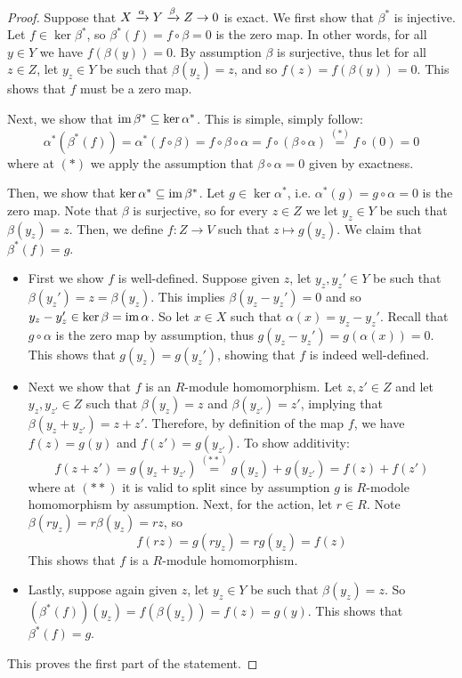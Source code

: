 \begin{proof}
    Suppose that $X\xrightarrow{\alpha} Y \xrightarrow{\beta} Z\to 0$ is exact. We first show that $\beta^*$ is injective. Let $f\in \ker \beta^*$, so $\beta^*(f) = f\circ \beta = 0$ is the zero map. In other words, for all $y\in Y$ we have $f(\beta(y))=0$. By assumption $\beta$ is surjective, thus let for all $z\in Z$, let $y_z\in Y$ be such that $\beta(y_z) = z$, and so $f(z) = f(\beta(y)) = 0$. This shows that $f$ must be a zero map.

    Next, we show that $\operatorname{im} \beta^* \subseteq \ker \alpha^*$. This is simple, simply follow:
    \[\alpha^*(\beta^*(f)) = \alpha^* (f\circ \beta) = f\circ \beta \circ \alpha = f\circ (\beta \circ \alpha) \overset{(*)}{=} f\circ (0) = 0\]
    where at $(*)$ we apply the assumption that $\beta\circ \alpha=0$ given by exactness.

    Then, we show that $\ker \alpha^* \subseteq \operatorname{im} \beta^*$. Let $g\in \ker \alpha^*$, i.e. $\alpha^* (g) = g \circ \alpha = 0$ is the zero map. Note that $\beta$ is surjective, so for every $z\in Z$ we let $y_z\in Y$ be such that $\beta(y_z)=z$. Then, we define $f:Z\to V$ such that $z\mapsto g(y_z)$. We claim that $\beta^*(f) = g$. 
    \begin{itemize}
        \item First we show $f$ is well-defined. Suppose given $z$, let $y_z, y_z'\in Y$ be such that $\beta(y_z')=z = \beta(y_z)$. This implies $\beta(y_z-y_z')=0$ and so $y_z - y_z'\in \ker \beta = \operatorname{im} \alpha$. So let $x\in X$ such that $\alpha(x) = y_z - y_z'$. Recall that $g\circ \alpha$ is the zero map by assumption, thus $g(y_z-y_z') = g(\alpha(x)) = 0$. This shows that $g(y_z) = g(y_z')$, showing that $f$ is indeed well-defined.
        \item Next we show that $f$ is an $R$-module homomorphism. Let $z, z'\in Z$ and let $y_z, y_{z'}\in Z$ such that $\beta(y_z) = z$ and $\beta(y_{z'}) = z'$, implying that $\beta(y_z+y_{z'}) = z+z'$. Therefore, by definition of the map $f$, we have $f(z) = g(y)$ and $f(z') = g(y_{z'})$. To show additivity:
        \[f(z+z') = g(y_z+y_{z'}) \overset{(**)}{=} g(y_z) + g(y_{z'}) = f(z) + f(z')\]
        where at $(**)$ it is valid to split since by assumption $g$ is $R$-modole homomorphism by assumption. Next, for the action, let $r\in R$. Note $\beta(ry_z) = r\beta(y_z) = rz$, so
        \[ f(rz) = g(ry_z) = rg(y_z) = f(z)\]
        This shows that $f$ is a $R$-module homomorphism.
        \item Lastly, suppose again given $z$, let $y_z\in Y$ be such that $\beta(y_z) = z$. So $(\beta^*(f))(y_z) = f(\beta(y_z)) = f(z) = g(y)$. This shows that $\beta^*(f) = g$.
    \end{itemize}
    This proves the first part of the statement.


\end{proof}

